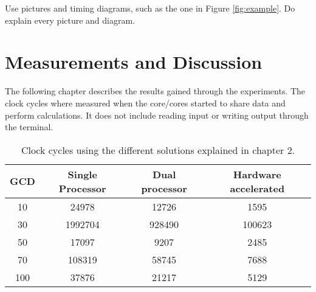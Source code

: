 \documentclass[11pt]{article}
\begin{document}
Use pictures and timing diagrams, such as the one in Figure \ref{fig:example}. Do explain every picture and diagram.


\section{Measurements and Discussion}
The following chapter describes the results gained through the experiments. The clock cycles where measured when the core/cores started to share data and perform calculations. It does not include reading input or writing output through the terminal.

\begin{table}[htbp]
   \centering
   \begin{tabular}{@{} cccc @{}} %
      \toprule
      \cmidrule(r){1-2} %
	GCD	& Single Processor	& Dual processor	& Hardware accelerated\\
      \midrule
      10	& 24978			& 12726			&1595\\
      30	& 1992704		&  928490		&100623\\
      50	& 17097			& 9207			&2485\\
      70	& 108319		& 58745			&7688\\
     100	& 37876			&  21217		&5129\\
      \bottomrule
   \end{tabular}
   \caption{Clock cycles using the different solutions explained in chapter 2.}
   \label{tab:Clockcycles}
\end{table}
\end{document}
